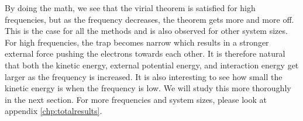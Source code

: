 By doing the math, we see that the virial theorem is satisfied for high frequencies, but as the frequency decreases, the theorem gets more and more off. This is the case for all the methods and is also observed for other system sizes. For high frequencies, the trap becomes narrow which results in a stronger external force pushing the electrons towards each other. It is therefore natural that both the kinetic energy, external potential energy, and interaction energy get larger as the frequency is increased. It is also interesting to see how small the kinetic energy is when the frequency is low. We will study this more thoroughly in the next section. For more frequencies and system sizes, please look at appendix \ref{chp:totalresults}.

\iffalse
